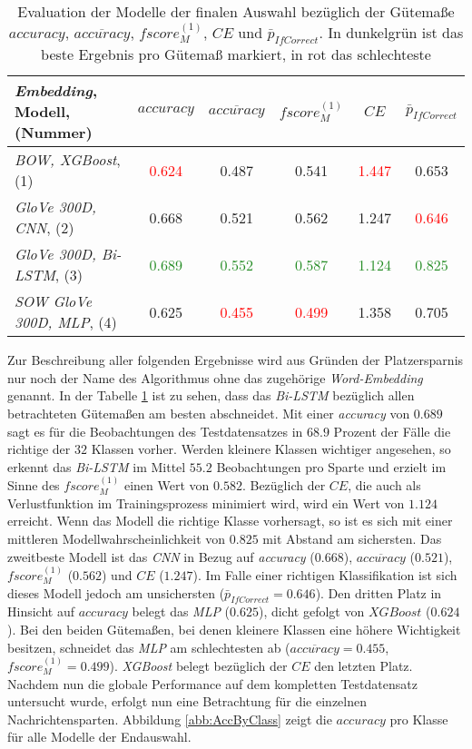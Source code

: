 \documentclass[a4paper,11pt]{article}
\begin{document}
\begin{table}[ht]
\centering
\begin{tabular}{|l||ccccc|}
  \hline
\textit{Embedding}, Modell, (Nummer) & $accuracy$ & $\overline{accuracy}$ & $fscore_M^{(1)}$ & $CE$ & $\bar{p}_{IfCorrect}$ \\ 
  \hline
\textit{BOW, XGBoost}, (1) & \textcolor{red}{0.624} & 0.487 & 0.541 & \textcolor{red}{1.447} & 0.653 \\ 
  \textit{GloVe 300D, CNN}, (2) & 0.668 & 0.521 & 0.562 & 1.247 & \textcolor{red}{0.646} \\ 
  \textit{GloVe 300D, Bi-LSTM}, (3) & \textcolor{ForestGreen}{0.689} & \textcolor{ForestGreen}{0.552} & \textcolor{ForestGreen}{0.587} & \textcolor{ForestGreen}{1.124} & \textcolor{ForestGreen}{0.825} \\ 
  \textit{SOW GloVe 300D, MLP}, (4) & 0.625 & \textcolor{red}{0.455} & \textcolor{red}{0.499} & 1.358 & 0.705 \\ 
   \hline
\end{tabular}
\caption{Evaluation der Modelle der finalen Auswahl bezüglich der Gütemaße $accuracy$, $\overline{accuracy}$, $fscore_M^{(1)}$, $CE$ und  $\bar{p}_{IfCorrect}$. In dunkelgrün ist das beste Ergebnis pro Gütemaß markiert, in rot das schlechteste}
\label{tab:finalSelection}

\end{table}

Zur Beschreibung aller folgenden Ergebnisse wird aus Gründen der Platzersparnis nur noch der Name des Algorithmus ohne das zugehörige \textit{Word-Embedding} genannt.
In der Tabelle \ref{tab:finalSelection} ist zu sehen, dass das \textit{Bi-LSTM} bezüglich allen betrachteten Gütemaßen am besten abschneidet. Mit einer \textit{accuracy} von $0.689$ sagt es für die Beobachtungen des Testdatensatzes in $68.9$ Prozent der Fälle die richtige der $32$ Klassen vorher. Werden kleinere Klassen wichtiger angesehen, so erkennt das \textit{Bi-LSTM} im Mittel $55.2$ Beobachtungen pro Sparte und erzielt im Sinne des $fscore_M^{(1)}$ einen Wert von $0.582$. Bezüglich der $CE$, die auch als Verlustfunktion im Trainingsprozess minimiert wird, wird ein Wert von $1.124$ erreicht. Wenn das Modell die richtige Klasse vorhersagt, so ist es sich mit einer mittleren Modellwahrscheinlichkeit von $0.825$ mit Abstand am sichersten. Das zweitbeste Modell ist das \textit{CNN} in Bezug auf \textit{accuracy} ($0.668$),  $\overline{accuracy}$ ($0.521$), $fscore_M^{(1)}$ ($0.562$) und $CE$ ($1.247$). Im Falle einer richtigen Klassifikation ist sich dieses Modell jedoch am unsichersten ($\bar{p}_{IfCorrect} =0.646$). Den dritten Platz in Hinsicht auf $accuracy$ belegt das \textit{MLP} ($0.625$), dicht gefolgt von $XGBoost$ ($0.624$). Bei den beiden Gütemaßen, bei denen kleinere Klassen eine höhere Wichtigkeit besitzen, schneidet das \textit{MLP} am schlechtesten ab ($\overline{accuracy} = 0.455$, $fscore_M^{(1)} = 0.499$). \textit{XGBoost} belegt bezüglich der $CE$ den letzten Platz.\\
Nachdem nun die globale Performance auf dem kompletten Testdatensatz untersucht wurde, erfolgt nun eine Betrachtung für die einzelnen Nachrichtensparten. Abbildung \ref{abb:AccByClass} zeigt die $accuracy$ pro Klasse für alle Modelle der Endauswahl.
\end{document}

